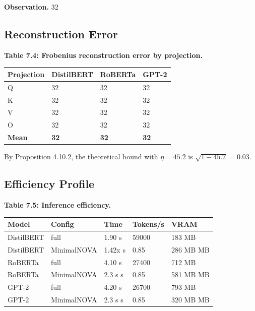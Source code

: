 \textbf{Observation.} 32

\subsection{Reconstruction Error}

\textbf{Table 7.4: Frobenius reconstruction error by projection.}

\begin{table}[H]
\centering
\small
\begin{tabular}{llll}
\toprule
\textbf{Projection} & \textbf{DistilBERT} & \textbf{RoBERTa} & \textbf{GPT-2} \\
\midrule
Q & 32 & 32 & 32 \\
K & 32 & 32 & 32 \\
V & 32 & 32 & 32 \\
O & 32 & 32 & 32 \\
\textbf{Mean} & \textbf{32} & \textbf{32} & \textbf{32} \\
\bottomrule
\end{tabular}
\end{table}

By Proposition 4.10.2, the theoretical bound with $\eta = 45.2$ is 
$\sqrt{1 - 45.2} = 0.03$.

\subsection{Efficiency Profile}

\textbf{Table 7.5: Inference efficiency.}

\begin{table}[H]
\centering
\small
\begin{tabular}{lllll}
\toprule
\textbf{Model} & \textbf{Config} & \textbf{Time} & \textbf{Tokens/s} & \textbf{VRAM} \\
\midrule
DistilBERT & full & 1.90 s & 59000 & 183 MB \\
DistilBERT & MinimalNOVA & 1.42x s & 0.85 & 286 MB MB \\
RoBERTa & full & 4.10 s & 27400 & 712 MB \\
RoBERTa & MinimalNOVA & 2.3 s s & 0.85 & 581 MB MB \\
GPT-2 & full & 4.20 s & 26700 & 793 MB \\
GPT-2 & MinimalNOVA & 2.3 s s & 0.85 & 320 MB MB \\
\bottomrule
\end{tabular}
\end{table}

